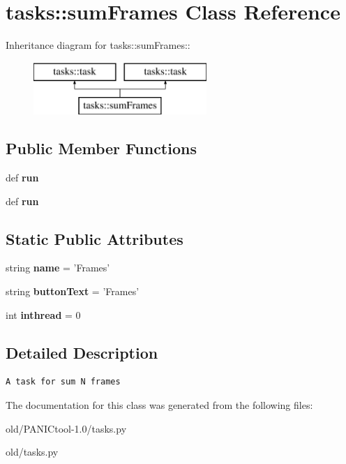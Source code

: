 \section{tasks::sum\-Frames Class Reference}
\label{classtasks_1_1sumFrames}
Inheritance diagram for tasks::sum\-Frames::\begin{figure}[H]
\begin{center}
\leavevmode
\includegraphics[height=2cm]{classtasks_1_1sumFrames}
\end{center}
\end{figure}
\subsection*{Public Member Functions}
\begin{CompactItemize}
\item 
def \textbf{run}\label{classtasks_1_1sumFrames_8505dc4d406e3855d5ea6f7ef62ea8f6}

\item 
def \textbf{run}\label{classtasks_1_1sumFrames_8505dc4d406e3855d5ea6f7ef62ea8f6}

\end{CompactItemize}
\subsection*{Static Public Attributes}
\begin{CompactItemize}
\item 
string \textbf{name} = '{\bfsum\-Frames}'\label{classtasks_1_1sumFrames_26a705fa0134ebed8b812a1869d5e29f}

\item 
string \textbf{button\-Text} = '{\bfsum\-Frames}'\label{classtasks_1_1sumFrames_6fe6d81705c571d117cbc4c0324b44bc}

\item 
int \textbf{inthread} = 0\label{classtasks_1_1sumFrames_75120b8d8397f28df2023c6736a2b734}

\end{CompactItemize}


\subsection{Detailed Description}


\footnotesize\begin{verbatim}A task for sum N frames
\end{verbatim}
\normalsize
 



The documentation for this class was generated from the following files:\begin{CompactItemize}
\item 
old/PANICtool-1.0/tasks.py\item 
old/tasks.py\end{CompactItemize}
